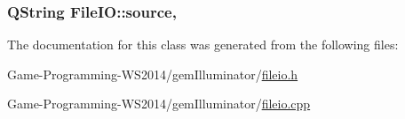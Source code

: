 \subsubsection[{source}]{\setlength{\rightskip}{0pt plus 5cm}Q\+String File\+I\+O\+::source\hspace{0.3cm}{\ttfamily [read]}, {\ttfamily [write]}}\label{class_file_i_o_ad4467aa6c50748ac1e7076d25dcd33cc}


The documentation for this class was generated from the following files\+:\begin{DoxyCompactItemize}
\item 
Game-\/\+Programming-\/\+W\+S2014/gem\+Illuminator/\hyperlink{fileio_8h}{fileio.\+h}\item 
Game-\/\+Programming-\/\+W\+S2014/gem\+Illuminator/\hyperlink{fileio_8cpp}{fileio.\+cpp}\end{DoxyCompactItemize}
